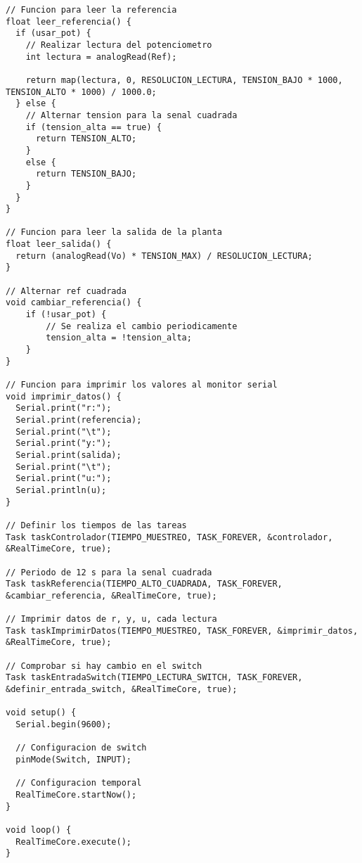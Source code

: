 \begin{adjustwidth}{0.5cm}{0.5cm}
\begin{lstlisting}[style=arduino, caption={Código implementado en Arduino para el sistema de control realimentado.}, label=lst:arduino]
// Funcion para leer la referencia
float leer_referencia() {
  if (usar_pot) {
    // Realizar lectura del potenciometro
    int lectura = analogRead(Ref);

    return map(lectura, 0, RESOLUCION_LECTURA, TENSION_BAJO * 1000, TENSION_ALTO * 1000) / 1000.0;
  } else {
    // Alternar tension para la senal cuadrada
    if (tension_alta == true) {
      return TENSION_ALTO;
    }
    else {
      return TENSION_BAJO;
    }
  }
}

// Funcion para leer la salida de la planta
float leer_salida() {
  return (analogRead(Vo) * TENSION_MAX) / RESOLUCION_LECTURA;
}

// Alternar ref cuadrada
void cambiar_referencia() {
    if (!usar_pot) {
        // Se realiza el cambio periodicamente
        tension_alta = !tension_alta;
    }
}

// Funcion para imprimir los valores al monitor serial
void imprimir_datos() {
  Serial.print("r:");
  Serial.print(referencia);
  Serial.print("\t");
  Serial.print("y:");
  Serial.print(salida);
  Serial.print("\t");
  Serial.print("u:");
  Serial.println(u);
}

// Definir los tiempos de las tareas
Task taskControlador(TIEMPO_MUESTREO, TASK_FOREVER, &controlador, &RealTimeCore, true);

// Periodo de 12 s para la senal cuadrada
Task taskReferencia(TIEMPO_ALTO_CUADRADA, TASK_FOREVER, &cambiar_referencia, &RealTimeCore, true);

// Imprimir datos de r, y, u, cada lectura
Task taskImprimirDatos(TIEMPO_MUESTREO, TASK_FOREVER, &imprimir_datos, &RealTimeCore, true);

// Comprobar si hay cambio en el switch
Task taskEntradaSwitch(TIEMPO_LECTURA_SWITCH, TASK_FOREVER, &definir_entrada_switch, &RealTimeCore, true);

void setup() {
  Serial.begin(9600);

  // Configuracion de switch
  pinMode(Switch, INPUT);

  // Configuracion temporal
  RealTimeCore.startNow();
}

void loop() {
  RealTimeCore.execute();
}
\end{lstlisting}
\end{adjustwidth}


